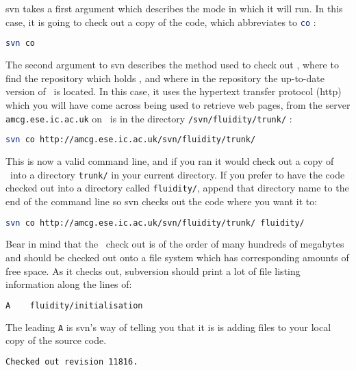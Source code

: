 svn takes a first argument which describes the mode in which it will run. In
this case, it is going to check out a copy of the code, which abbreviates to
\lstinline[language=Bash]+co+ :

\begin{lstlisting}[language=Bash]
svn co
\end{lstlisting}

The second argument to svn describes the method used to check out \fluidity,
where to find the repository which holds \fluidity, and where in the repository
the up-to-date version of \fluidity\ is located. In this case, it uses the
hypertext transfer protocol (http) which you will have come across being used
to retrieve web pages, from the server 
\lstinline[language=Bash]+amcg.ese.ic.ac.uk+ on \fluidity\ is in the directory
\lstinline[language=Bash]+/svn/fluidity/trunk/+ :

\begin{lstlisting}[language=Bash]
svn co http://amcg.ese.ic.ac.uk/svn/fluidity/trunk/
\end{lstlisting}

This is now a valid command line, and if you ran it would check out a copy of
\fluidity\ into a directory \lstinline[language=Bash]+trunk/+ in your current
directory. If you prefer to have the code checked out into a directory called
\lstinline[language=Bash]+fluidity/+, append that directory name to the end of
the command line so svn checks out the code where you want it to:

\begin{lstlisting}[language=Bash]
svn co http://amcg.ese.ic.ac.uk/svn/fluidity/trunk/ fluidity/
\end{lstlisting}

Bear in mind that the \fluidity\ check out is of the order of many hundreds of
megabytes and should be checked out onto a file system which has corresponding
amounts of free space. As it checks out, subversion should print a lot of file
listing information along the lines of:

\begin{lstlisting}[language=Bash]
A    fluidity/initialisation
\end{lstlisting}

The leading \lstinline[language=Bash]+A+ is svn's way of telling you that it is
is adding files to your local copy of the source code.

\begin{lstlisting}[language=Bash]
Checked out revision 11816.
\end{lstlisting}

